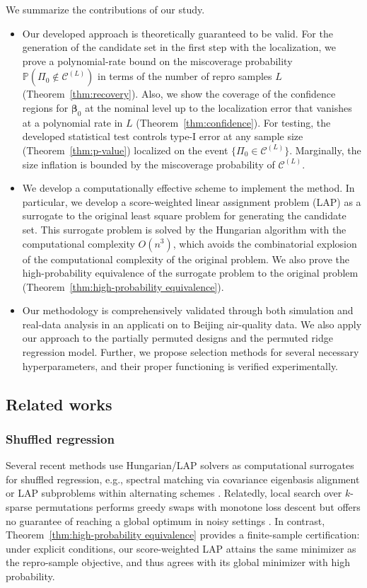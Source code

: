 \documentclass[11pt, reqno]{amsart}
\newcommand{\mC}{\mathcal{C}}
\newcommand{\1}{\mbox{1}\hspace{-0.25em}\mbox{l}}
\theoremstyle{definition}\newtheorem{problem}{Problem}[section]
\theoremstyle{definition}\newtheorem{definition}[problem]{Definition}
\theoremstyle{remark}\newtheorem{assumption}{Assumption}
\theoremstyle{remark}\newtheorem{remark}[problem]{Remark}
\theoremstyle{definition}\newtheorem{example}[problem]{Example}
\theoremstyle{plain}\newtheorem{theorem}[problem]{Theorem}
\theoremstyle{plain}\newtheorem{question}[problem]{Question}
\theoremstyle{plain}\newtheorem{lemma}[problem]{Lemma}
\theoremstyle{plain}\newtheorem{proposition}[problem]{Proposition}
\theoremstyle{plain}\newtheorem{corollary}[problem]{Corollary}
\theoremstyle{plain}\newtheorem{conjecture}[problem]{Conjecture}
\begin{document}
We summarize the contributions of our study.
\begin{itemize}
    \item Our developed approach is theoretically guaranteed to be valid. For the generation of the candidate set in the first step with the localization, we prove a polynomial-rate bound on the miscoverage probability $\mathbb{P}(\Pi_0\notin\mathcal{C}^{(L)})$ in terms of the number of repro samples $L$ (Theorem~\ref{thm:recovery}). Also, we show the coverage of the confidence regions for $\bm{\beta}_0$ at the nominal level up to the localization error that vanishes at a polynomial rate in $L$ (Theorem~\ref{thm:confidence}). For testing, the developed statistical test controls type-I error at any sample size (Theorem~\ref{thm:p-value}) localized on the event $\{\Pi_0\in\mC^{(L)}\}$. Marginally, the size inflation is bounded by the miscoverage probability of $\mC^{(L)}$.
    \item We develop a computationally effective scheme to implement the method. In particular, we develop a score-weighted linear assignment problem (LAP) as a surrogate to the original least square problem for generating the candidate set. This surrogate problem is solved by the Hungarian algorithm with the computational complexity $O(n^3)$, which avoids the combinatorial explosion of the computational complexity of the original problem. We also prove the high-probability equivalence of the surrogate problem to the original problem (Theorem~\ref{thm:high-probability equivalence}). 
    \item Our methodology is comprehensively validated through both simulation and real-data analysis in an applicati   on to Beijing air-quality data. We also apply our approach  to the partially permuted designs and the permuted ridge regression model.
    Further, we propose selection methods for several necessary hyperparameters, and their proper functioning is verified experimentally.
\end{itemize}


\subsection{Related works}

\subsubsection{Shuffled regression}
Several recent methods use Hungarian/LAP solvers as computational surrogates for shuffled regression, e.g., spectral matching via covariance eigenbasis alignment \citep{liu2025shuffled} or LAP subproblems within alternating schemes \citep{li2021generalized}. 
Relatedly, local search over $k$-sparse permutations performs greedy swaps with monotone loss descent but offers no guarantee of reaching a global optimum in noisy settings \citep{mazumder2023linear}. 
In contrast, Theorem~\ref{thm:high-probability equivalence} provides a finite-sample certification: under explicit conditions, our score-weighted LAP attains the same minimizer as the repro-sample objective, and thus agrees with its global minimizer with high probability.
\end{document}
